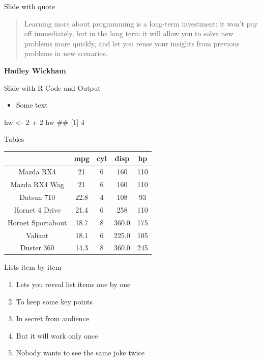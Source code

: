 \documentclass[ignorenonframetext,]{beamer}
\newenvironment{Shaded}{}{}
\newcommand{\CommentTok}[1]{\textcolor[rgb]{0.00,0.50,0.00}{#1}}
\newcommand{\DecValTok}[1]{#1}
\newcommand{\NormalTok}[1]{#1}
\newcommand{\OperatorTok}[1]{#1}
\newcommand{\StringTok}[1]{\textcolor[rgb]{0.00,0.50,0.50}{#1}}
\providecommand{\tightlist}{%
  \setlength{\itemsep}{0pt}\setlength{\parskip}{0pt}}
\begin{document}
\begin{frame}{Slide with quote}
\protect\hypertarget{slide-with-quote}{}

\begin{quote}
Learning more about programming is a long-term investment: it won't pay
off immediately, but in the long term it will allow you to solve new
problems more quickly, and let you reuse your insights from previous
problems in new scenarios.
\end{quote}

\textbf{Hadley Wickham}

\end{frame}

\begin{frame}[fragile]{Slide with R Code and Output}
\protect\hypertarget{slide-with-r-code-and-output}{}

\begin{itemize}
\tightlist
\item
  Some text \scriptsize
\end{itemize}

\begin{Shaded}
\begin{Highlighting}[]
\NormalTok{hw <-}\StringTok{ }\DecValTok{2} \OperatorTok{+}\StringTok{ }\DecValTok{2}
\NormalTok{hw}
\CommentTok{## [1] 4}
\end{Highlighting}
\end{Shaded}

\end{frame}

\begin{frame}{Tables}
\protect\hypertarget{tables}{}

\begin{longtable}[]{@{}ccccc@{}}
\toprule
& mpg & cyl & disp & hp\tabularnewline
\midrule
\endhead
Mazda RX4 & 21 & 6 & 160 & 110\tabularnewline
Mazda RX4 Wag & 21 & 6 & 160 & 110\tabularnewline
Datsun 710 & 22.8 & 4 & 108 & 93\tabularnewline
Hornet 4 Drive & 21.4 & 6 & 258 & 110\tabularnewline
Hornet Sportabout & 18.7 & 8 & 360.0 & 175\tabularnewline
Valiant & 18.1 & 6 & 225.0 & 105\tabularnewline
Duster 360 & 14.3 & 8 & 360.0 & 245\tabularnewline
\bottomrule
\end{longtable}

\end{frame}

\begin{frame}{Lists item by item}
\protect\hypertarget{lists-item-by-item}{}

\begin{enumerate}[<+->]
\tightlist
\item
  Lets you reveal list items one by one
\item
  To keep some key points
\item
  In secret from audience
\item
  But it will work only once
\item
  Nobody wants to see the same joke twice
\end{enumerate}

\end{frame}
\end{document}
